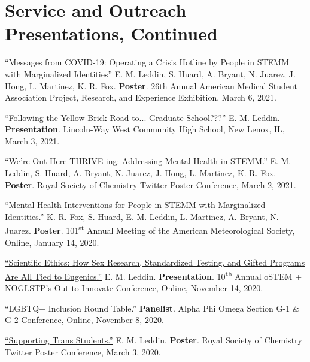 \documentclass[letterpaper,11pt]{article}
\begin{document}
\newpage

\section{Service and Outreach Presentations, Continued}
\begin{etaremune}[start=14]
\small{

  \item \textnormal{``Messages from COVID-19: Operating a Crisis Hotline by People in STEMM with Marginalized Identities'' E. M. Leddin, S. Huard, A. Bryant, N. Juarez, J. Hong, L. Martinez, K. R. Fox. \textbf{Poster}. 26th Annual American Medical Student Association Project, Research, and Experience Exhibition, March 6, 2021.}
  \item \textnormal{``Following the Yellow-Brick Road to... Graduate School???'' E. M. Leddin. \textbf{Presentation}. Lincoln-Way West Community High School, New Lenox, IL, March 3, 2021.}
  \item \textnormal{\href{https://twitter.com/ThriveLifeline/status/1366720589130592259?s=20}{``We're Out Here THRIVE-ing: Addressing Mental Health in STEMM.''} E. M. Leddin, S. Huard, A. Bryant, N. Juarez, J. Hong, L. Martinez, K. R. Fox. \textbf{Poster}. Royal Society of Chemistry Twitter Poster Conference, March 2, 2021.}
  \item \textnormal{\href{https://bit.ly/2020-oSTEM-Ethics}{``Mental Health Interventions for People in STEMM with Marginalized Identities.''} K. R. Fox, S. Huard, E. M. Leddin, L. Martinez, A. Bryant, N. Juarez. \textbf{Poster}. 101\textsuperscript{st} Annual Meeting of the American Meteorological Society, Online, January 14, 2020.}
  \item \textnormal{\href{https://bit.ly/2020-oSTEM-Ethics}{``Scientific Ethics: How Sex Research, Standardized Testing, and Gifted Programs Are All Tied to Eugenics.''} E. M. Leddin. \textbf{Presentation}. 10\textsuperscript{th} Annual oSTEM + NOGLSTP's Out to Innovate\texttrademark{} Conference, Online, November 14, 2020.}
  \item \textnormal{``LGBTQ+ Inclusion Round Table.'' \textbf{Panelist}. Alpha Phi Omega Section G-1 \& G-2 Conference, Online, November 8, 2020.}
  \item \textnormal{\href{https://twitter.com/EmLedd1/status/1234812260515749889?s=20}{``Supporting Trans Students.''} E. M. Leddin. \textbf{Poster}. Royal Society of Chemistry Twitter Poster Conference, March 3, 2020.}
}
\end{etaremune}
\end{document}
